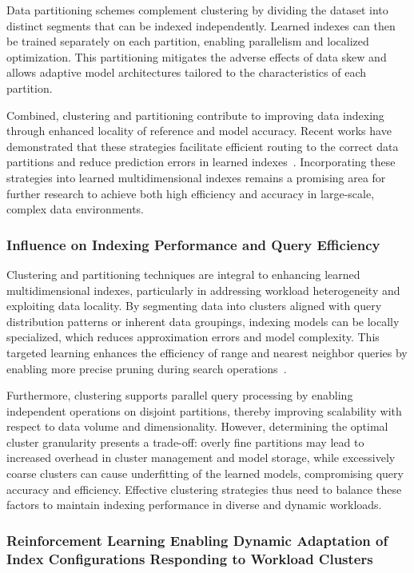 \documentclass[sigconf]{acmart}
\begin{document}
Data partitioning schemes complement clustering by dividing the dataset into distinct segments that can be indexed independently. Learned indexes can then be trained separately on each partition, enabling parallelism and localized optimization. This partitioning mitigates the adverse effects of data skew and allows adaptive model architectures tailored to the characteristics of each partition.

Combined, clustering and partitioning contribute to improving data indexing through enhanced locality of reference and model accuracy. Recent works have demonstrated that these strategies facilitate efficient routing to the correct data partitions and reduce prediction errors in learned indexes~\cite{}. Incorporating these strategies into learned multidimensional indexes remains a promising area for further research to achieve both high efficiency and accuracy in large-scale, complex data environments.

\subsubsection{Influence on Indexing Performance and Query Efficiency}

Clustering and partitioning techniques are integral to enhancing learned multidimensional indexes, particularly in addressing workload heterogeneity and exploiting data locality. By segmenting data into clusters aligned with query distribution patterns or inherent data groupings, indexing models can be locally specialized, which reduces approximation errors and model complexity. This targeted learning enhances the efficiency of range and nearest neighbor queries by enabling more precise pruning during search operations~\cite{ref34}.

Furthermore, clustering supports parallel query processing by enabling independent operations on disjoint partitions, thereby improving scalability with respect to data volume and dimensionality. However, determining the optimal cluster granularity presents a trade-off: overly fine partitions may lead to increased overhead in cluster management and model storage, while excessively coarse clusters can cause underfitting of the learned models, compromising query accuracy and efficiency. Effective clustering strategies thus need to balance these factors to maintain indexing performance in diverse and dynamic workloads.

\subsubsection{Reinforcement Learning Enabling Dynamic Adaptation of Index Configurations Responding to Workload Clusters}
\end{document}
